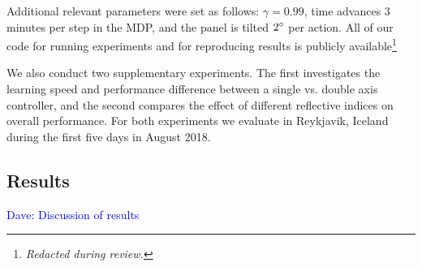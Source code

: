 \documentclass{article}
\newcommand{\dnote}[1]{\textcolor{blue}{Dave: #1}}
\begin{document}
Additional relevant parameters were set as follows: $\gamma = 0.99$, time advances $3$ minutes per step in the MDP, and the panel is tilted $2\degree$ per action. All of our code for running experiments and for reproducing results is publicly available\footnote{{\it Redacted during review.}} %

We also conduct two supplementary experiments. The first investigates the learning speed and performance difference between a single vs. double axis controller, and the second compares the effect of different reflective indices on overall performance. For both experiments we evaluate in Reykjavik, Iceland during the first five days in August 2018.

\subsection{Results}
\dnote{Discussion of results}
\end{document}
